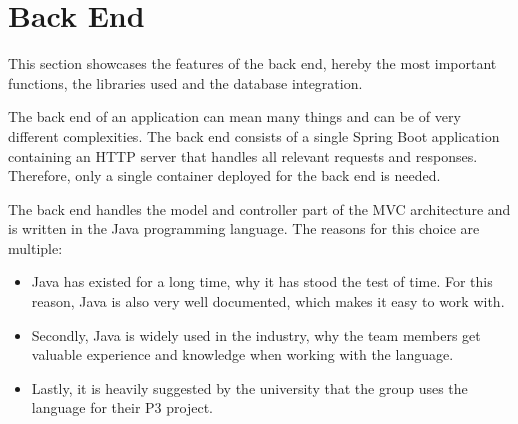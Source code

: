\section{Back End}\label{sec:back-end}

This section showcases the features of the back end, hereby the most important functions, the libraries used
and the database integration.

The back end of an application can mean many things and can be of very different complexities.
The back end consists of a single Spring Boot application containing an HTTP server that handles all
relevant requests and responses.
Therefore, only a single container deployed for the back end is needed.

The back end handles the model and controller part of the MVC architecture and is written in the Java programming
language.
The reasons for this choice are multiple:

\begin{itemize}
    \item Java has existed for a long time, why it has stood the test of time.
    For this reason, Java is also very well documented, which makes it easy to work with.

    \item Secondly, Java is widely used in the industry, why the team members get valuable experience and knowledge when
    working with the language.

    \item Lastly, it is heavily suggested by the university that the group uses the language for their P3 project.
\end{itemize}





